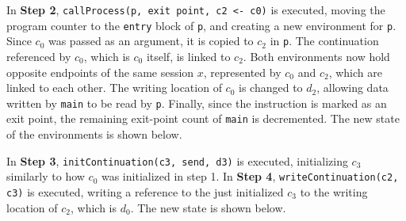 In \textbf{Step 2}, \texttt{callProcess(p, exit point, c2 <- c0)} is executed, moving the program counter to the \texttt{entry} block of \texttt{p}, and creating a new environment for \texttt{p}. Since $c_0$ was passed as an argument, it is copied to $c_2$ in \texttt{p}. The continuation referenced by $c_0$, which is $c_0$ itself, is linked to $c_2$. Both environments now hold opposite endpoints of the same session $x$, represented by $c_0$ and $c_2$, which are linked to each other. The writing location of $c_0$ is changed to $d_2$, allowing data written by \texttt{main} to be read by \texttt{p}. Finally, since the instruction is marked as an exit point, the remaining exit-point count of \texttt{main} is decremented. The new state of the environments is shown below.
\begin{center}
\end{center}

In \textbf{Step 3}, \texttt{initContinuation(c3, send, d3)} is executed, initializing $c_3$ similarly to how $c_0$ was initialized in step 1. In \textbf{Step 4}, \texttt{writeContinuation(c2, c3)} is executed, writing a reference to the just initialized $c_3$ to the writing location of $c_2$, which is $d_0$. The new state is shown below.

